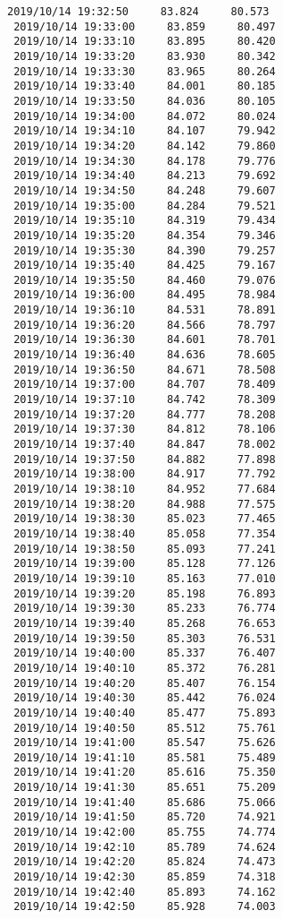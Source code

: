 \documentclass[11pt]{article}
\begin{document}
\begin{Verbatim}[commandchars=\\\{\}]
 2019/10/14 19:32:50     83.824     80.573
 2019/10/14 19:33:00     83.859     80.497
 2019/10/14 19:33:10     83.895     80.420
 2019/10/14 19:33:20     83.930     80.342
 2019/10/14 19:33:30     83.965     80.264
 2019/10/14 19:33:40     84.001     80.185
 2019/10/14 19:33:50     84.036     80.105
 2019/10/14 19:34:00     84.072     80.024
 2019/10/14 19:34:10     84.107     79.942
 2019/10/14 19:34:20     84.142     79.860
 2019/10/14 19:34:30     84.178     79.776
 2019/10/14 19:34:40     84.213     79.692
 2019/10/14 19:34:50     84.248     79.607
 2019/10/14 19:35:00     84.284     79.521
 2019/10/14 19:35:10     84.319     79.434
 2019/10/14 19:35:20     84.354     79.346
 2019/10/14 19:35:30     84.390     79.257
 2019/10/14 19:35:40     84.425     79.167
 2019/10/14 19:35:50     84.460     79.076
 2019/10/14 19:36:00     84.495     78.984
 2019/10/14 19:36:10     84.531     78.891
 2019/10/14 19:36:20     84.566     78.797
 2019/10/14 19:36:30     84.601     78.701
 2019/10/14 19:36:40     84.636     78.605
 2019/10/14 19:36:50     84.671     78.508
 2019/10/14 19:37:00     84.707     78.409
 2019/10/14 19:37:10     84.742     78.309
 2019/10/14 19:37:20     84.777     78.208
 2019/10/14 19:37:30     84.812     78.106
 2019/10/14 19:37:40     84.847     78.002
 2019/10/14 19:37:50     84.882     77.898
 2019/10/14 19:38:00     84.917     77.792
 2019/10/14 19:38:10     84.952     77.684
 2019/10/14 19:38:20     84.988     77.575
 2019/10/14 19:38:30     85.023     77.465
 2019/10/14 19:38:40     85.058     77.354
 2019/10/14 19:38:50     85.093     77.241
 2019/10/14 19:39:00     85.128     77.126
 2019/10/14 19:39:10     85.163     77.010
 2019/10/14 19:39:20     85.198     76.893
 2019/10/14 19:39:30     85.233     76.774
 2019/10/14 19:39:40     85.268     76.653
 2019/10/14 19:39:50     85.303     76.531
 2019/10/14 19:40:00     85.337     76.407
 2019/10/14 19:40:10     85.372     76.281
 2019/10/14 19:40:20     85.407     76.154
 2019/10/14 19:40:30     85.442     76.024
 2019/10/14 19:40:40     85.477     75.893
 2019/10/14 19:40:50     85.512     75.761
 2019/10/14 19:41:00     85.547     75.626
 2019/10/14 19:41:10     85.581     75.489
 2019/10/14 19:41:20     85.616     75.350
 2019/10/14 19:41:30     85.651     75.209
 2019/10/14 19:41:40     85.686     75.066
 2019/10/14 19:41:50     85.720     74.921
 2019/10/14 19:42:00     85.755     74.774
 2019/10/14 19:42:10     85.789     74.624
 2019/10/14 19:42:20     85.824     74.473
 2019/10/14 19:42:30     85.859     74.318
 2019/10/14 19:42:40     85.893     74.162
 2019/10/14 19:42:50     85.928     74.003

\end{Verbatim}
\end{document}
